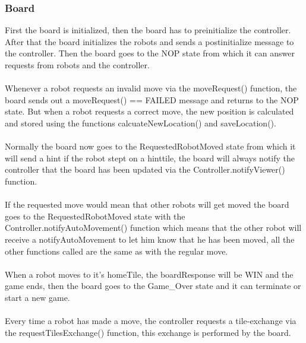     \subsubsection{Board}
	First the board is initialized, then the board has to preinitialize the controller. After that the board initializes the robots and sends a postinitialize message to the controller. Then the board goes to the NOP state from which it can answer requests from robots and the controller. \\
\\
Whenever a robot requests an invalid move via the moveRequest() function, the board sends out a moveRequest() == FAILED message and returns to the NOP state. But when a robot requests a correct move, the new position is calculated and stored using the functions calcuateNewLocation() and saveLocation(). \\
\\
Normally the board now goes to the RequestedRobotMoved state from which it will send a hint if the robot stept on a hinttile, the board will always notify the controller that the board has been updated via the Controller.notifyViewer() function.\\
\\
If the requested move would mean that other robots will get moved the board goes to the RequestedRobotMoved state with the Controller.notifyAutoMovement() function which means that the other robot will receive a notifyAutoMovement to let him know that he has been moved, all the other functions called are the same as with the regular move.\\
\\
When a robot moves to it's homeTile, the boardResponse will be WIN and the game ends, then the board goes to the Game\_Over state and it can terminate or start a new game.\\
\\
Every time a robot has made a move, the controller requests a tile-exchange via the requestTilesExchange() function, this exchange is performed by the board.\\
	
